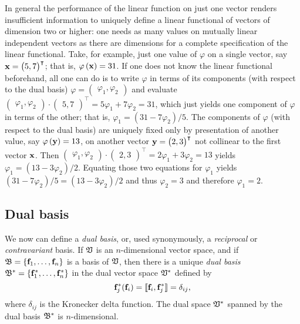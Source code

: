 {In general the performance of the linear function on just one vector renders insufficient
information to uniquely define a linear functional of vectors of dimension two or higher:
one needs as many values on mutually
linear independent vectors as there are dimensions for a complete specification of the linear functional.
Take, for example, just one value of $\varphi$ on a single vector, say
${\bf x}=\begin{pmatrix} 5,7 \end{pmatrix}^\intercal$; that is,
$\varphi \left( {\bf x} \right)=31$. If one does not
know the linear functional beforehand,
all one can do is to write $\varphi$ in terms of its components (with respect to the dual basis)
$\varphi = \begin{pmatrix} \varphi_1 ,\varphi_2 \end{pmatrix}$
and evaluate
$\begin{pmatrix} \varphi_1 ,\varphi_2 \end{pmatrix} \cdot \begin{pmatrix} 5,7 \end{pmatrix}^\intercal
= 5\varphi_1 +7\varphi_2 = 31$, which just yields one component of $\varphi$ in terms of the other;
that is, $\varphi_1  = (31-7\varphi_2)/5$.
The components of $\varphi$ (with respect to the dual basis) are uniquely fixed
only by presentation of another value, say
$\varphi \left( {\bf y} \right)=13$,
on another vector
${\bf y}=\begin{pmatrix} 2,3 \end{pmatrix}^\intercal$ not collinear to the first vector ${\bf x}$.
Then
$\begin{pmatrix} \varphi_1 ,\varphi_2 \end{pmatrix} \cdot \begin{pmatrix} 2,3 \end{pmatrix}^\intercal
= 2\varphi_1 +3\varphi_2 = 13$  yields $\varphi_1  = (13-3\varphi_2)/2$.
Equating those two equations for $\varphi_1$ yields
$(31-7\varphi_2)/5=(13-3\varphi_2)/2$ and thus $\varphi_2=3$ and therefore $\varphi_1=2$.


\eexample
}

\subsection{Dual basis}
\label{2011-m-Dualbasis}

We now can define a {\em dual basis}, or, used synonymously, a {\em reciprocal} or {\em contravariant} basis.
If ${\frak V}$ is an $n$-dimensional vector space, and if
${\frak B} = \{{\bf f}_1,\ldots , {\bf f}_n\}$
is a basis of  ${\frak V}$,
then there is a unique {\em dual basis}
${\frak B}^\ast
=\{{\bf f}_1^\ast ,\ldots , {\bf f}_n^\ast \}$ in the dual vector space ${\frak V}^\ast $
defined by
\begin{equation}
{\bf f}_j^\ast ({\bf f}_i) =  \llbracket {\bf f}_i,  {\bf f}_j^\ast \rrbracket =\delta_{ij},
\label{2011-m-Dualbasis-e1}
\end{equation}
where  $\delta_{ij}$
is the Kronecker delta function.
The dual space  ${\frak V}^\ast $ spanned by the dual basis ${\frak B}^\ast $ is $n$-dimensional.

